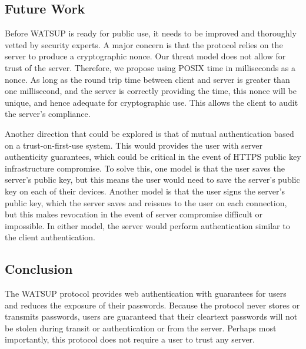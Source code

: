 \subsection{Future Work}

Before WATSUP is ready for public use, it needs to be improved and thoroughly vetted by security experts. A major concern is that the protocol relies on the server to produce a cryptographic nonce. Our threat model does not allow for trust of the server. Therefore, we propose using POSIX time in milliseconds as a nonce. As long as the round trip time between client and server is greater than one millisecond, and the server is correctly providing the time, this nonce will be unique, and hence adequate for cryptographic use. This allows the client to audit the server's compliance.

Another direction that could be explored is that of mutual authentication based on a trust-on-first-use system. This would provides the user with server authenticity guarantees, which could be critical in the event of HTTPS public key infrastructure compromise. To solve this, one model is that the user saves the server's public key, but this means the user would need to save the server's public key on each of their devices. Another model is that the user signs the server's public key, which the server saves and reissues to the user on each connection, but this makes revocation in the event of server compromise difficult or impossible. In either model, the server would perform authentication similar to the client authentication.

\subsection{Conclusion}

The WATSUP protocol provides web authentication with guarantees for users and reduces the exposure of their passwords. Because the protocol never stores or transmits passwords, users are guaranteed that their cleartext passwords will not be stolen during transit or authentication or from the server. Perhaps most importantly, this protocol does not require a user to trust any server.
